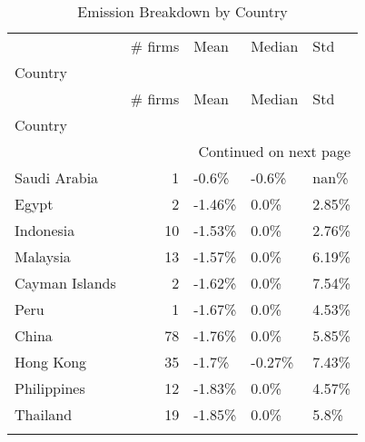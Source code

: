 \begin{longtable}{lrlll}
\toprule
 & \# firms & Mean & Median & Std \\
Country &  &  &  &  \\
\midrule
\endfirsthead
\toprule
 & \# firms & Mean & Median & Std \\
Country &  &  &  &  \\
\midrule
\endhead
\midrule
\multicolumn{5}{r}{Continued on next page} \\
\midrule
\endfoot
\bottomrule
\endlastfoot
Saudi Arabia & 1 & -0.6\% & -0.6\% & nan\% \\
Egypt & 2 & -1.46\% & 0.0\% & 2.85\% \\
Indonesia & 10 & -1.53\% & 0.0\% & 2.76\% \\
Malaysia & 13 & -1.57\% & 0.0\% & 6.19\% \\
Cayman Islands & 2 & -1.62\% & 0.0\% & 7.54\% \\
Peru & 1 & -1.67\% & 0.0\% & 4.53\% \\
China & 78 & -1.76\% & 0.0\% & 5.85\% \\
Hong Kong & 35 & -1.7\% & -0.27\% & 7.43\% \\
Philippines & 12 & -1.83\% & 0.0\% & 4.57\% \\
Thailand & 19 & -1.85\% & 0.0\% & 5.8\% \\
\caption{Emission Breakdown by Country}
\label{tab:emission_breakdown_country}
\end{longtable}
